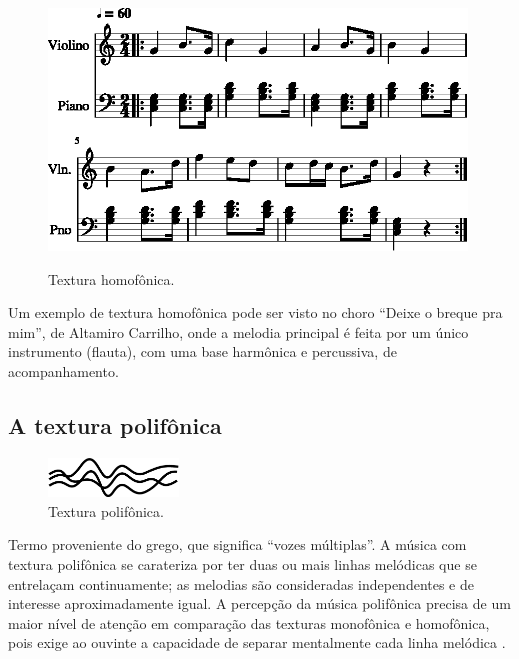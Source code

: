 \begin{figure}[!h]
\centering
    \href{https://drive.google.com/file/d/11VBw8pTGFqF-PBofFWZvbqwkfXB56Bfy/view?usp=sharing}{\includegraphics[width=0.99\textwidth]{chapters/cap-musicalidade-percepcion/textura-homofonica-1.eps}}
  \caption{Textura homofônica.}
\label{fig:ex:homofonica}
\end{figure}

\begin{example}
Um exemplo de textura homofônica pode ser visto no choro ``Deixe o breque pra mim'',
de Altamiro Carrilho, 
onde a melodia principal é feita por um único instrumento (flauta), 
com uma base harmônica e percussiva, de acompanhamento.
\end{example}



\subsection{A textura polifônica}
\label{subsec:polifonica}
\begin{figure}
\centering
    \includegraphics[width=0.31\textwidth]{chapters/cap-musicalidade-percepcion/polifonica1.eps}
  \caption{Textura polifônica.}
\end{figure}
Termo proveniente do grego, que significa ``vozes múltiplas''.%
A música com textura polifônica se carateriza por ter duas ou mais linhas melódicas  
que se entrelaçam continuamente;
as melodias são consideradas independentes e de interesse aproximadamente igual.
A percepção da música polifônica precisa de um maior nível de atenção 
em comparação das texturas monofônica e homofônica,
pois exige ao ouvinte a capacidade de separar mentalmente cada linha melódica  
\cite[pp. 79-80]{copland1974ouvir} \cite[pp. 29]{kerman2015listen} 
\cite[pp. 42]{bennett1993elementos} \cite[pp. 59]{holland2013music}
\cite[pp. 687]{apel1969harvard}.

